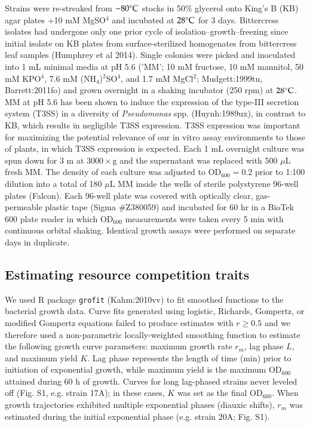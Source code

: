 \documentclass[%
preprint,
superscriptaddress,
 amsmath,amssymb,
 aps,
]{revtex4-1}
\begin{document}
Strains were re-streaked from $-80 \degree \text{C}$ stocks in 50\% glycerol onto King's B (KB) agar plates +10 mM MgSO$^4$ and incubated at
$28 \degree \text{C}$ for 3 days. Bittercress isolates had undergone only one prior cycle of isolation--growth--freezing since initial isolate on KB plates from surface-sterilized homogenates from bittercress leaf samples (Humphrey et al 2014). Single colonies were picked and inoculated into 1 mL minimal media at pH 5.6 ('MM'; 10 mM fructose, 10 mM mannitol, 50 mM KPO$^{4}$, 7.6 mM (NH$_{4}$)$^{2}$SO$^4$, and 1.7 mM MgCl$^{2}$; Mudgett:1999tu, Barrett:2011fo) and grown overnight in a shaking incubator (250 rpm) at $28 \degree \text{C}$. MM at pH 5.6 has been shown to induce the expression of the type-III secretion system (T3SS) in a diversity of \emph{Pseudomonas} spp. (Huynh:1989ux), in contrast to KB, which results in negligible T3SS expression. T3SS expression was important for maximizing the potential relevance of our in vitro assay environments to those of plants, in which T3SS expression is expected. Each 1 mL overnight culture was spun down for 3 m at $3000 \times \text{g}$ and the supernatant was replaced with 500 $\mu\text{L}$ fresh MM. The density of each culture was adjusted to $\text{OD}_{600} = 0.2$ prior to 1:100 dilution into a total of 180 $\mu\text{L}$ MM inside the wells of sterile polystyrene 96-well plates (Falcon). Each 96-well plate was covered with optically clear, gas-permeable plastic tape (Sigma \#Z380059) and incubated for 60 hr in a BioTek 600 plate reader in which $\text{OD}_{600}$ measurements were taken every 5 min with continuous orbital shaking. Identical growth assays were performed on separate days in duplicate.

\subsection*{Estimating resource competition traits}

We used R package \texttt{grofit} (Kahm:2010vv) to fit smoothed
functions to the bacterial growth data. Curve fits generated using
logistic, Richards, Gompertz, or modified Gompertz equations failed to
produce estimates with $r \geq 0.5$ and we therefore used a
non-parametric locally-weighted smoothing function to estimate
the following growth curve parameters: maximum growth rate
$r_m$, lag phase $L$, and maximum yield $K$. Lag phase represents the length of time (min) prior to initiation of exponential growth, while maximum yield is the maximum $\text{OD}_{600}$ attained during 60 h of growth. Curves for long lag-phased strains never leveled off (Fig. S1, e.g. strain 17A); in
these cases, $K$ was set as the final $\text{OD}_{600}$. When
growth trajectories exhibited multiple exponential phases (diauxic
shifts), $r_m$ was estimated during the initial exponential phase (e.g. strain 20A; Fig. S1).
\end{document}

